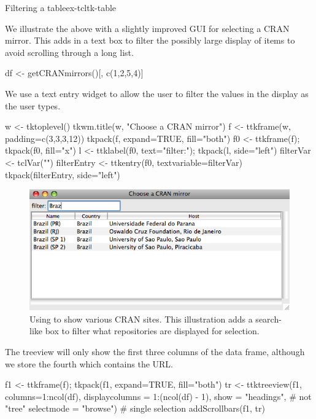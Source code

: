 \begin{example}{Filtering a table}{ex-tcltk-table}

We illustrate the above with a slightly improved GUI for selecting a CRAN mirror. This adds in a text box to filter the possibly large display of items to avoid scrolling through a long list. 
\begin{Schunk}
\begin{Sinput}
 df <- getCRANmirrors()[, c(1,2,5,4)]
\end{Sinput}
\end{Schunk}
We use a text entry widget to allow the user to filter the values in the display as the user types.
\begin{Schunk}
\begin{Sinput}
 w <- tktoplevel()
 tkwm.title(w, "Choose a CRAN mirror")
 f <- ttkframe(w, padding=c(3,3,3,12))
 tkpack(f, expand=TRUE, fill="both")
 f0 <- ttkframe(f); tkpack(f0, fill="x")
 l <- ttklabel(f0, text="filter:"); tkpack(l, side="left")
 filterVar <- tclVar("")
 filterEntry <- ttkentry(f0, textvariable=filterVar)
 tkpack(filterEntry, side="left")
\end{Sinput}
\end{Schunk}

\begin{figure}
  \centering
  \includegraphics[width=.8\textwidth]{fig-tcltk-filter-table.png}
  \caption{Using  to show various CRAN sites. This illustration adds a search-like box to filter what repositories are displayed for selection.}
  \label{fig:fig-tcltk-filter-table}
\end{figure}


The treeview  will only show the first three columns of the data frame, although we store the fourth which contains the URL.
\begin{Schunk}
\begin{Sinput}
 f1 <- ttkframe(f); tkpack(f1, expand=TRUE, fill="both")
 tr <- ttktreeview(f1, columns=1:ncol(df), 
                   displaycolumns = 1:(ncol(df) - 1), 
                   show = "headings",     # not "tree" 
                   selectmode = "browse") # single selection
 addScrollbars(f1, tr)
\end{Sinput}
\end{Schunk}


\end{example}
